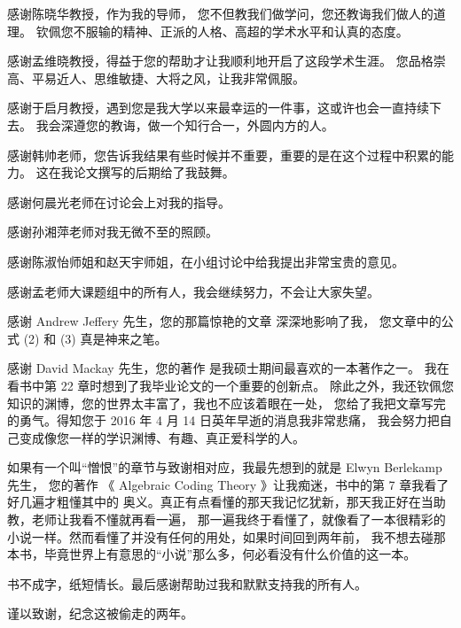 

感谢陈晓华教授，作为我的导师，
您不但教我们做学问，您还教诲我们做人的道理。
钦佩您不服输的精神、正派的人格、高超的学术水平和认真的态度。

感谢孟维晓教授，得益于您的帮助才让我顺利地开启了这段学术生涯。
您品格崇高、平易近人、思维敏捷、大将之风，让我非常佩服。

感谢于启月教授，遇到您是我大学以来最幸运的一件事，这或许也会一直持续下去。
我会深遵您的教诲，做一个知行合一，外圆内方的人。

感谢韩帅老师，您告诉我结果有些时候并不重要，重要的是在这个过程中积累的能力。
这在我论文撰写的后期给了我鼓舞。

感谢何晨光老师在讨论会上对我的指导。

感谢孙湘萍老师对我无微不至的照顾。

感谢陈淑怡师姐和赵天宇师姐，在小组讨论中给我提出非常宝贵的意见。

感谢孟老师大课题组中的所有人，我会继续努力，不会让大家失望。


感谢 Andrew Jeffery 先生，您的那篇惊艳的文章 深深地影响了我，
您文章中的公式 (2) 和 (3) 真是神来之笔。

感谢 David Mackay 先生，您的著作  是我硕士期间最喜欢的一本著作之一。
我在看书中第 22 章时想到了我毕业论文的一个重要的创新点。
除此之外，我还钦佩您知识的渊博，您的世界太丰富了，我也不应该着眼在一处，
您给了我把文章写完的勇气。得知您于 2016 年 4 月 14 日英年早逝的消息我非常悲痛，
我会努力把自己变成像您一样的学识渊博、有趣、真正爱科学的人。

如果有一个叫“憎恨”的章节与致谢相对应，我最先想到的就是 Elwyn Berlekamp 先生， 您的著作
《 Algebraic Coding Theory 》让我痴迷，书中的第 7 章我看了好几遍才粗懂其中的
奥义。真正有点看懂的那天我记忆犹新，那天我正好在当助教，老师让我看不懂就再看一遍，
那一遍我终于看懂了，就像看了一本很精彩的小说一样。然而看懂了并没有任何的用处，如果时间回到两年前，
我不想去碰那本书，毕竟世界上有意思的“小说”那么多，何必看没有什么价值的这一本。

书不成字，纸短情长。最后感谢帮助过我和默默支持我的所有人。

谨以致谢，纪念这被偷走的两年。
